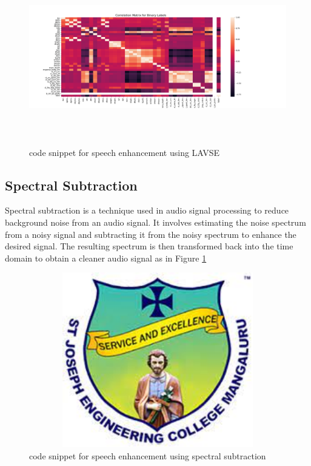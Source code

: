 \documentclass[12pt,a4paper]{report}
\begin{document}
\begin{figure}[hbtp]
\centering
\includegraphics[width=5in,height=3in]{pic/correlation_matrix_bin.png}
\caption{code snippet for speech enhancement using LAVSE}
\end{figure}

\subsection{Spectral Subtraction}
Spectral subtraction is a technique used in audio signal processing to reduce background noise from an audio signal. It involves estimating the noise spectrum from a noisy signal and subtracting it from the noisy spectrum to enhance the desired signal. The resulting spectrum is then transformed back into the time domain to obtain a cleaner audio signal as in Figure \ref{fig:pic3}
\newpage
\begin{figure}[hbtp]
\centering
\includegraphics[width=5in,height=3in]{pic/sjeclogo.png}
\caption{code snippet for speech enhancement using spectral subtraction}
\label{fig:pic3}
\end{figure}
\end{document}
